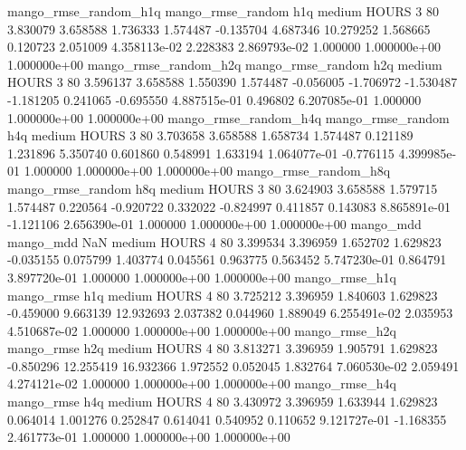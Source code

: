 mango_rmse_random_h1q mango_rmse_random                  h1q     medium    HOURS                 3 80  3.830079       3.658588 1.736333       1.574487   -0.135704      4.687346     10.279252     1.568665       0.120723  2.051009 4.358113e-02     2.228383   2.869793e-02            1.000000    1.000000e+00        1.000000e+00
mango_rmse_random_h2q mango_rmse_random                  h2q     medium    HOURS                 3 80  3.596137       3.658588 1.550390       1.574487   -0.056005     -1.706972     -1.530487    -1.181205       0.241065 -0.695550 4.887515e-01     0.496802   6.207085e-01            1.000000    1.000000e+00        1.000000e+00
mango_rmse_random_h4q mango_rmse_random                  h4q     medium    HOURS                 3 80  3.703658       3.658588 1.658734       1.574487    0.121189      1.231896      5.350740     0.601860       0.548991  1.633194 1.064077e-01    -0.776115   4.399985e-01            1.000000    1.000000e+00        1.000000e+00
mango_rmse_random_h8q mango_rmse_random                  h8q     medium    HOURS                 3 80  3.624903       3.658588 1.579715       1.574487    0.220564     -0.920722      0.332022    -0.824997       0.411857  0.143083 8.865891e-01    -1.121106   2.656390e-01            1.000000    1.000000e+00        1.000000e+00
            mango_mdd         mango_mdd                  NaN     medium    HOURS                 4 80  3.399534       3.396959 1.652702       1.629823   -0.035155      0.075799      1.403774     0.045561       0.963775  0.563452 5.747230e-01     0.864791   3.897720e-01            1.000000    1.000000e+00        1.000000e+00
       mango_rmse_h1q        mango_rmse                  h1q     medium    HOURS                 4 80  3.725212       3.396959 1.840603       1.629823   -0.459000      9.663139     12.932693     2.037382       0.044960  1.889049 6.255491e-02     2.035953   4.510687e-02            1.000000    1.000000e+00        1.000000e+00
       mango_rmse_h2q        mango_rmse                  h2q     medium    HOURS                 4 80  3.813271       3.396959 1.905791       1.629823   -0.850296     12.255419     16.932366     1.972552       0.052045  1.832764 7.060530e-02     2.059491   4.274121e-02            1.000000    1.000000e+00        1.000000e+00
       mango_rmse_h4q        mango_rmse                  h4q     medium    HOURS                 4 80  3.430972       3.396959 1.633944       1.629823    0.064014      1.001276      0.252847     0.614041       0.540952  0.110652 9.121727e-01    -1.168355   2.461773e-01            1.000000    1.000000e+00        1.000000e+00
